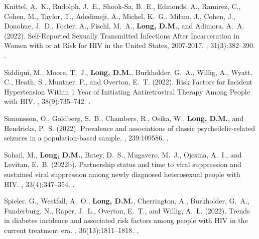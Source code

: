 \begin{thebibliography}{}
Knittel, A.~K., Rudolph, J.~E., Shook-Sa, B.~E., Edmonds, A., Ramirez, C.,
  Cohen, M., Taylor, T., Adedimeji, A., Michel, K.~G., Milam, J., Cohen, J.,
  Donohue, J.~D., Foster, A., Fischl, M.~A., \textbf{Long, D.M.}, and Adimora, A.~A.
  (2022).
\newblock Self-{Reported} {Sexually} {Transmitted} {Infections} {After}
  {Incarceration} in {Women} with or at {Risk} for {HIV} in the {United}
  {States}, 2007-2017.
, 31(3):382--390.
.  


Siddiqui, M., Moore, T.~J., \textbf{Long, D.M.}, Burkholder, G.~A., Willig, A., Wyatt,
  C., Heath, S., Muntner, P., and Overton, E.~T. (2022).
\newblock Risk {Factors} for {Incident} {Hypertension} {Within} 1 {Year} of
  {Initiating} {Antiretroviral} {Therapy} {Among} {People} with {HIV}.
, 38(9):735--742.
.  


Simonsson, O., Goldberg, S.~B., Chambers, R., Osika, W., \textbf{Long, D.M.}, and
  Hendricks, P.~S. (2022).
\newblock Prevalence and associations of classic psychedelic-related seizures
  in a population-based sample.
, 239:109586.
.  




Sohail, M., \textbf{Long, D.M.}, Batey, D.~S., Mugavero, M.~J., Ojesina, A.~I., and
  Levitan, E.~B. (2022b).
\newblock Partnership status and time to viral suppression and sustained viral
  suppression among newly diagnosed heterosexual people with {HIV}.
, 33(4):347--354.
.  


Spieler, G., Westfall, A.~O., \textbf{Long, D.M.}, Cherrington, A., Burkholder, G.~A.,
  Funderburg, N., Raper, J.~L., Overton, E.~T., and Willig, A.~L. (2022).
\newblock Trends in diabetes incidence and associated risk factors among people
  with {HIV} in the current treatment era.
, 36(13):1811--1818.
.  



\end{thebibliography}
